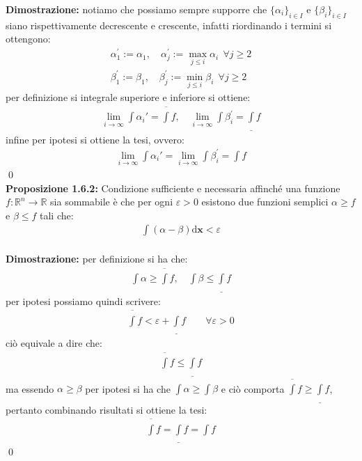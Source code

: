 \documentclass{article}
\numberwithin{equation}{subsection}
\begin{document}
\textbf{Dimostrazione:} notiamo che possiamo sempre supporre che $\{ \alpha_i \}_{i \in I}$ e $\{ \beta_i \}_{i \in I}$ siano rispettivamente decrescente e crescente, infatti riordinando i termini si ottengono:
\begin{gather*}
    \alpha_1^{'} := \alpha_1, \quad \alpha_j^{'} := \max_{j \leq i} \alpha_i \ \ \forall j \geq 2  \\
    \beta_1^{'} := \beta_1, \quad \beta_j^{'} := \min_{j \leq i} \beta_i \ \ \forall j \geq 2 
\end{gather*}
per definizione si integrale superiore e inferiore si ottiene:
\begin{gather*}
    \lim_{i \rightarrow \infty} \int \alpha_i{'} = \overline{\int} f, \quad
    \lim_{i \rightarrow \infty} \int \beta_{i}^{'} = \underline{\int} f 
\end{gather*}
infine per ipotesi si ottiene la tesi, ovvero:
\begin{gather*}
    \lim_{i \rightarrow \infty} \int \alpha_i{'} = \lim_{i \rightarrow \infty} \int \beta_{i}^{'} = \int f 
\end{gather*} \qed \\
\textbf{Proposizione 1.6.2:} Condizione sufficiente e necessaria affinché una funzione \\ $f : \mathbb{R}^n \longrightarrow \mathbb{R}$ sia sommabile è che per ogni $\varepsilon > 0$ esistono due funzioni semplici $\alpha \geq f$ e $\beta \leq f$ tali che:
\begin{gather*}
    \int (\alpha - \beta) \mathrm{d} \mathbf{x} < \varepsilon 
\end{gather*} \\

\textbf{Dimostrazione:} per definizione si ha che:
\begin{gather*}
    \int \alpha \geq \overline{\int} f, \quad \int \beta \leq \underline{\int} f 
\end{gather*}
per ipotesi possiamo quindi scrivere:
\begin{gather*}
    \overline{\int} f < \varepsilon + \underline{\int} f \qquad \forall \varepsilon > 0 
\end{gather*}
ciò equivale a dire che:
\begin{gather*}
    \overline{\int} f \leq \underline{\int} f 
\end{gather*}
ma essendo $\alpha \geq \beta$ per ipotesi si ha che $\int \alpha \geq \int \beta$ e ciò comporta $\overline{\int} f \geq \underline{\int} f$, pertanto combinando risultati si ottiene la tesi:
\begin{gather*}
    \overline{\int} f = \underline{\int} f = \int f 
\end{gather*} \qed
\end{document}
